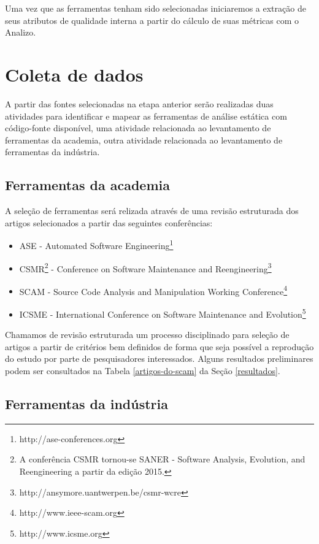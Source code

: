 \documentclass[qual, classic, a4paper]{ufbathesis}
\begin{document}
Uma vez que as ferramentas tenham sido selecionadas iniciaremos a extração de
seus atributos de qualidade interna a partir do cálculo de suas métricas com o
Analizo.

\section{Coleta de dados}

A partir das fontes selecionadas na etapa anterior serão realizadas duas
atividades para identificar e mapear as ferramentas de análise estática com
código-fonte disponível, uma atividade relacionada ao levantamento de
ferramentas da academia, outra atividade relacionada ao levantamento de
ferramentas da indústria.

\subsection{Ferramentas da academia}

A seleção de ferramentas será relizada através de uma revisão estruturada dos
artigos selecionados a partir das seguintes conferências:

\begin{itemize}
  \item ASE - Automated Software
    Engineering\footnote{http://ase-conferences.org}
  \item CSMR\footnote{A conferência CSMR tornou-se SANER - Software Analysis,
    Evolution, and Reengineering a partir da edição 2015.} - Conference on
    Software Maintenance and
    Reengineering\footnote{http://ansymore.uantwerpen.be/csmr-wcre}
  \item SCAM - Source Code Analysis and Manipulation Working
    Conference\footnote{http://www.ieee-scam.org}
  \item ICSME - International Conference on Software Maintenance and
    Evolution\footnote{http://www.icsme.org}
\end{itemize}

Chamamos de revisão estruturada um processo disciplinado para seleção de
artigos a partir de critérios bem definidos de forma que seja possível a
reprodução do estudo por parte de pesquisadores interessados. Alguns
resultados preliminares podem ser consultados na Tabela \ref{artigos-do-scam}
da Seção \ref{resultados}.

\subsection{Ferramentas da indústria}
\end{document}
